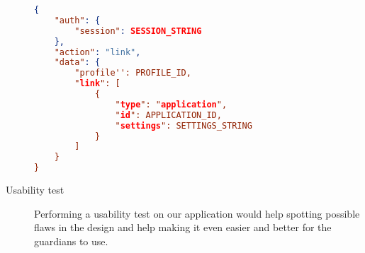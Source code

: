 \begin{description}
\begin{lstlisting}[language=json,firstnumber=1,caption={JSON query to write application data.},label=lst:jsonwrite]
{
    "auth": {
        "session": SESSION_STRING
    },
    "action": "link",
    "data": {
        "profile'': PROFILE_ID,
        "link": [
            {
                "type": "application",
                "id": APPLICATION_ID,
                "settings": SETTINGS_STRING
            }
        ]
    }
}
\end{lstlisting}

\item[Usability test] Performing a usability test on our application would help spotting possible flaws in the design and help making it even easier and better for the guardians to use. 

\end{description}
